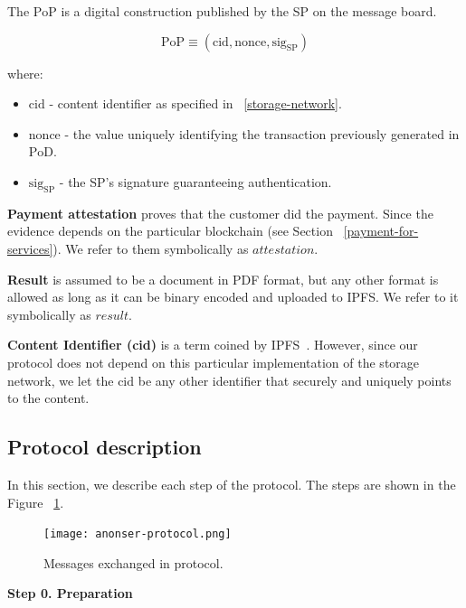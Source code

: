 \documentclass{ieeeaccess}
\begin{document}
The $\mathrm{PoP}$ is a digital construction published by the SP on the message board.

\[\mathrm{PoP} \equiv (\mathrm{cid}, \mathrm{nonce}, \mathrm{sig}_\mathrm{SP})\]

where:

\begin{itemize}

\item
  \(\mathrm{cid}\) - content identifier as specified in ~\ref{storage-network}.
\item
  \(\mathrm{nonce}\) - the value uniquely identifying the transaction previously generated in $\mathrm{PoD}$.
\item
  \(\mathrm{sig}_\mathrm{SP}\) - the SP's signature guaranteeing authentication.
\end{itemize}

\noindent \textbf
{Payment attestation}\label{payment-attestation}
proves that the customer did the payment. Since the
evidence depends on the particular blockchain (see Section ~\ref{payment-for-services}). We refer to them symbolically as
\(attestation\).

\noindent \textbf
{Result}\label{results} is assumed to be a document in PDF format, but any other format is allowed as long as it can be binary encoded and uploaded to IPFS. We refer to it symbolically as $result$.

\noindent \textbf
{Content Identifier (cid)}\label{content-identifier-cid}  is a term coined by IPFS~\cite{Contenta59}. However, since our protocol does not depend on
this particular implementation of the storage network, we let the $\mathrm{cid}$ be any other identifier that securely and uniquely points to the content.

\subsection{Protocol description}\label{protocol-description}

In this section, we describe each step of the protocol. The steps are
shown in the Figure ~\ref{fig:protocol-diagram}.

\begin{figure}[h!]
\texttt{[image: anonser-protocol.png]}
\centering
\caption{Messages exchanged in protocol.}
\label{fig:protocol-diagram}
\end{figure}

\noindent \textbf
{Step 0.  Preparation}\label{step-0-preparation}
\end{document}
